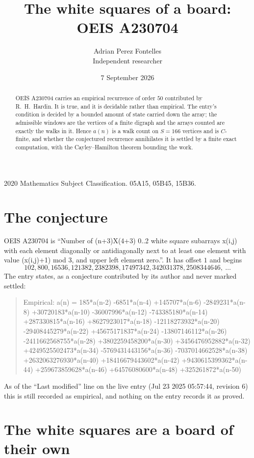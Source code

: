 \documentclass[11pt,a4paper]{article}
\title{The white squares of a board: OEIS A230704}
\author{Adrian Perez Fontelles\\ \small Independent researcher}
\date{7 September 2026}
\theoremstyle{plain}
\theoremstyle{definition}
\begin{document}
\maketitle

\begin{abstract}
OEIS A230704 carries an empirical recurrence of order $50$ contributed by R.~H.~Hardin. It is
true, and it is decidable rather than empirical. The entry's condition is decided by a bounded amount of state carried down the array; the
admissible windows are the vertices of a finite digraph and the arrays counted are exactly the
walks in it. Hence $a(n)$ is a walk count on $S=166$ vertices and is $C$-finite, and whether the
conjectured recurrence annihilates it is settled by a finite exact computation, with the
Cayley--Hamilton theorem bounding the work.
\end{abstract}

\noindent\small 2020 Mathematics Subject Classification. 05A15, 05B45, 15B36.\normalsize

\section{The conjecture}

OEIS A230704 is ``Number of (n+3)X(4+3) 0..2 white square subarrays x(i,j) with each element diagonally or antidiagonally next to at least one element with value (x(i,j)+1) mod 3, and upper left element zero.''. It has offset $1$ and begins
\[
102, 800, 16536, 121382, 2382398, 17497342, 342031378, 2508344646,\ \dots
\]
The entry states, as a conjecture contributed by its author and never marked settled:
\begin{quote}
Empirical: a(n) = 185*a(n-2) -6851*a(n-4) +145707*a(n-6) -2849231*a(n-8) +30720183*a(n-10) -36007996*a(n-12) -743385180*a(n-14) +287330815*a(n-16) +8627923017*a(n-18) -12118273932*a(n-20) -29408445279*a(n-22) +45675171837*a(n-24) -13807146112*a(n-26) -2411662568755*a(n-28) +3802259458200*a(n-30) +3456476952882*a(n-32) +4249525502473*a(n-34) -5769431443156*a(n-36) -7037014662528*a(n-38) +2632063276930*a(n-40) +18416679443602*a(n-42) +9430615399362*a(n-44) +259673859628*a(n-46) +64576080600*a(n-48) +325261872*a(n-50)
\end{quote}
As of the ``Last modified'' line on the live entry (Jul 23 2025 05:57:44, revision 6) this is still
recorded as empirical, and nothing on the entry records it as proved.

\section{The white squares are a board of their own}
\end{document}
